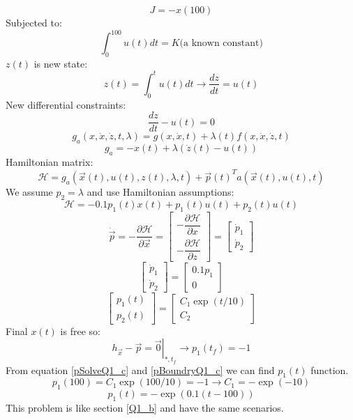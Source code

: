 $$J = -x(100)$$
Subjected to:
$$\int_0^{100}u(t)dt = K\text{(a known constant)}$$
$z(t)$ is new state:
$$z(t) = \int_0^{t}u(t)dt \to \dfrac{dz}{dt} =u(t) $$
New differential constraints:
$$\dfrac{dz}{dt} - u(t) = 0$$
$$g_a(x, \dot x, \dot z, t, \lambda) = g(x, \dot x, t) + \lambda(t)f(x, \dot x, \dot z, t) $$
$$g_a = -x(t) + \lambda (\dot z (t)- u(t))$$
Hamiltonian matrix:
$$\mathcal{H} =  g_a(\vec x(t), u(t), z(t), \lambda,  t) + {\vec{p}(t)}^Ta(\vec x(t), u(t), t)$$
We assume $p_2 = \lambda$ and use Hamiltonian assumptions:
\begin{equation}\label{HamiltonianQ1_c}
	\mathcal{H} = -0.1p_1(t)x(t)+p_1(t)u(t) + p_2(t)u(t)
\end{equation}
$$\dot{\vec{p}} = -\dfrac{\partial \mathcal{H} }{\partial \vec x} =  \begin{bmatrix}
	-\dfrac{\partial \mathcal{H} }{\partial x} \\[10pt]
	-\dfrac{\partial \mathcal{H} }{\partial z} 
\end{bmatrix} = 
\begin{bmatrix}
	\dot p_1 \\
	\dot p_2
\end{bmatrix}
$$
$$
\begin{bmatrix}
	\dot p_1 \\
	\dot p_2
\end{bmatrix} = \begin{bmatrix}
	0.1p_1\\
	0
\end{bmatrix}
$$
\begin{equation}\label{pSolveQ1_c}
	\begin{bmatrix}
		p_1(t)\\
		p_2(t)
	\end{bmatrix} = 
	\begin{bmatrix}
		C_1\exp(t/10)\\
		C_2
	\end{bmatrix}
\end{equation}
Final $x(t)$ is free so:
\begin{equation}\label{pBoundryQ1_c}
 \left .h_{\vec x} - \vec{p} = \vec{0} \right \vert_{*, t_f} \to p_1(t_f) = -1
\end{equation}
From equation \ref{pSolveQ1_c} and \ref{pBoundryQ1_c} we can find $p_1(t)$ function.
$$
p_1(100) = C_1\exp(100/10) = -1 \to C_1 = -\exp(-10)
$$
$$
p_1(t) = -\exp(0.1(t-100))$$
This problem is like section \ref{Q1_b} and have the same scenarios.